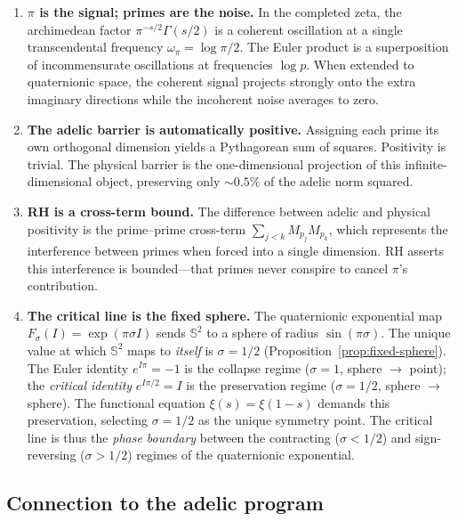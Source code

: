 \documentclass[11pt,a4paper]{article}
\theoremstyle{definition}
\begin{document}
\begin{enumerate}
\item \textbf{$\pi$ is the signal; primes are the noise.} In the completed zeta, the archimedean factor $\pi^{-s/2}\Gamma(s/2)$ is a coherent oscillation at a single transcendental frequency $\omega_\pi = \log\pi/2$. The Euler product is a superposition of incommensurate oscillations at frequencies $\log p$. When extended to quaternionic space, the coherent signal projects strongly onto the extra imaginary directions while the incoherent noise averages to zero.

\item \textbf{The adelic barrier is automatically positive.} Assigning each prime its own orthogonal dimension yields a Pythagorean sum of squares. Positivity is trivial. The physical barrier is the one-dimensional projection of this infinite-dimensional object, preserving only $\sim 0.5\%$ of the adelic norm squared.

\item \textbf{RH is a cross-term bound.} The difference between adelic and physical positivity is the prime--prime cross-term $\sum_{j<k} M_{p_j} M_{p_k}$, which represents the interference between primes when forced into a single dimension. RH asserts this interference is bounded---that primes never conspire to cancel $\pi$'s contribution.

\item \textbf{The critical line is the fixed sphere.} The quaternionic exponential map $F_\sigma(I) = \exp(\pi\sigma I)$ sends $\mathbb{S}^2$ to a sphere of radius $\sin(\pi\sigma)$. The unique value at which $\mathbb{S}^2$ maps to \emph{itself} is $\sigma = 1/2$ (Proposition~\ref{prop:fixed-sphere}). The Euler identity $e^{I\pi} = -1$ is the collapse regime ($\sigma = 1$, sphere $\to$ point); the \emph{critical identity} $e^{I\pi/2} = I$ is the preservation regime ($\sigma = 1/2$, sphere $\to$ sphere). The functional equation $\xi(s) = \xi(1-s)$ demands this preservation, selecting $\sigma = 1/2$ as the unique symmetry point. The critical line is thus the \emph{phase boundary} between the contracting ($\sigma < 1/2$) and sign-reversing ($\sigma > 1/2$) regimes of the quaternionic exponential.
\end{enumerate}

\subsection{Connection to the adelic program}
\end{document}
